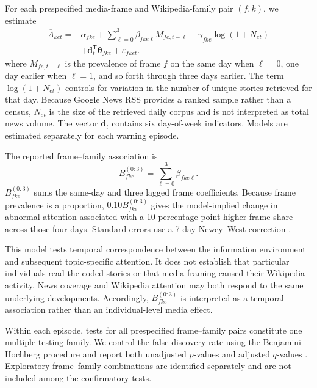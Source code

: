 \elsevierclasstrue\documentclass[preprint,12pt]{elsarticle}%
\begin{document}
For each prespecified media-frame and Wikipedia-family pair $(f,k)$, we
estimate
\begin{equation}
\begin{split}
\overline{A}_{ket}
={}&
\alpha_{fke}
+\sum_{\ell=0}^{3}
\beta_{fke\ell}M_{fe,t-\ell}
+\gamma_{fke}\log(1+N_{et}) \\
&+\mathbf{d}_{t}^{\mathsf{T}}\boldsymbol{\theta}_{fke}
+\varepsilon_{fket}.
\end{split}
\label{eq:distributedlag}
\end{equation}
where $M_{fe,t-\ell}$ is the prevalence of frame $f$ on the same day when $\ell=0$, one day earlier when $\ell=1$, and so forth through three days earlier. The term $\log(1+N_{et})$ controls for variation in the number of unique stories retrieved for that day. Because Google News RSS provides a ranked sample rather than a census, $N_{et}$ is the size of the retrieved daily corpus and is not interpreted as total news volume. The vector $\mathbf{d}_t$ contains six day-of-week indicators. Models are estimated separately for each warning episode.

The reported frame--family association is
\begin{equation}
B_{fke}^{(0:3)}=\sum_{\ell=0}^{3}\beta_{fke\ell}.
\label{eq:cumulativelag}
\end{equation}
\(B_{fke}^{(0:3)}\) sums the same-day and three lagged frame coefficients. Because frame prevalence is a proportion, \(0.10B_{fke}^{(0:3)}\) gives the model-implied change in abnormal attention associated with a 10-percentage-point higher frame share across those four days. Standard errors use a 7-day Newey--West correction \citep{neweywest1987hac}.

This model tests temporal correspondence between the information environment and subsequent topic-specific attention. It does not establish that particular individuals read the coded stories or that media framing caused their Wikipedia activity. News coverage and Wikipedia attention may both respond to the same underlying developments. Accordingly, $B_{fke}^{(0:3)}$ is interpreted as a temporal association rather than an individual-level media effect.

Within each episode, tests for all prespecified frame--family pairs constitute one multiple-testing family. We control the false-discovery rate using the Benjamini--Hochberg procedure and report both unadjusted $p$-values and adjusted $q$-values \citep{benjamini1995fdr}. Exploratory frame--family combinations are identified separately and are not included among the confirmatory tests.
\end{document}
